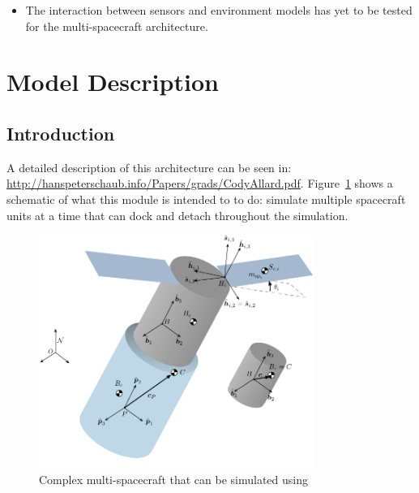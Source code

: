 \begin{itemize}
\item The interaction between sensors and environment models has yet to be tested for the multi-spacecraft architecture. 
 
\end{itemize}

\section{Model Description}

\subsection{Introduction}

A detailed description of this architecture can be seen in: \url{http://hanspeterschaub.info/Papers/grads/CodyAllard.pdf}. Figure~\ref{fig:FlexSloshFigure} shows a schematic of what this module is intended to to do: simulate multiple spacecraft units at a time that can dock and detach throughout the simulation. 

\begin{figure}[htbp]
	\centerline{
		\includegraphics[width=0.8\textwidth]{Figures/multiSC}}
	\caption{Complex multi-spacecraft that can be simulated using }
	\label{fig:FlexSloshFigure}
\end{figure}
